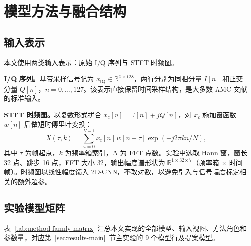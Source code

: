 \chapter{模型方法与融合结构}

\section{输入表示}

本文使用两类输入表示：原始 I/Q 序列与 STFT 时频图。

\textbf{I/Q 序列。}基带采样信号记为 \(x_{\mathrm{IQ}}\in\mathbb{R}^{2\times128}\)，两行分别为同相分量 \(I[n]\) 和正交分量 \(Q[n]\)，\(n=0,\ldots,127\)。该表示直接保留时间采样结构，是大多数 AMC 文献的标准输入\cite{oshea2016cnn,sainath2015cldnn,xu2020mcldnn}。

\textbf{STFT 时频图。}以复数形式拼合 \(x_c[n]=I[n]+jQ[n]\)，对 \(x_c\) 施加窗函数 \(w[n]\) 后做短时傅里叶变换：
\begin{equation}
  X(\tau,k)=\sum_{n=0}^{N-1} x_c[n]\,w[n-\tau]\exp\!\left(-j2\pi kn/N\right),
  \label{eq:stft-definition}
\end{equation}
其中 \(\tau\) 为帧起点，\(k\) 为频率箱索引，\(N\) 为 FFT 点数。实验中选取 Hann 窗，窗长 32 点、跳步 16 点，FFT 大小 32，输出幅度谱形状为 \(\mathbb{R}^{1\times32\times7}\)（频率箱 \(\times\) 时间帧）。时频图以线性幅度馈入 2D-CNN，不取对数，以避免引入与信号幅度标定相关的额外超参。

\section{实验模型矩阵}

表~\ref{tab:method-family-matrix} 汇总本文实现的全部模型、输入视图、方法角色和参数量，对应第~\ref{sec:results-main}~节主实验的 9 个模型行及提案模型。

